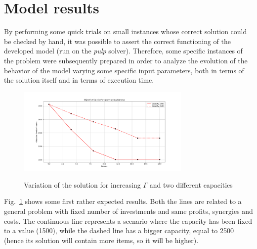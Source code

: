 \documentclass{article}
\begin{document}
\section{Model results}
By performing some quick trials on small instances whose correct solution could be checked by hand, it was possible to assert the correct functioning of the developed model (run on the \textit{pulp} solver). Therefore, some specific instances of the problem were subsequently prepared in order to analyze the evolution of the behavior of the model varying some specific input parameters, both in terms of the solution itself and in terms of execution time.\\

\begin{figure}[!ht]
\centering
{\includegraphics[width=0.75\textwidth]{Objective_function_model_2.png}}
\caption{Variation of the solution for increasing $\Gamma$ and two different capacities}
\label{model_1}
\end{figure}

Fig.~\ref{model_1} shows some first rather expected results. Both the lines are related to a general problem with fixed number of investments and same profits, synergies and costs. The continuous line represents a scenario where the capacity has been fixed to a value (1500), while the dashed line has a bigger capacity, equal to 2500 (hence its solution will contain more items, so it will be higher).  \\
\end{document}
